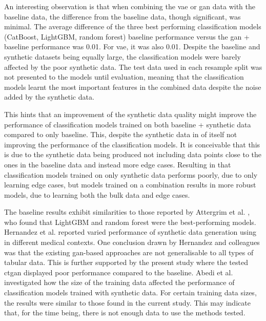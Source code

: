 \documentclass[12pt, a4paper]{article}
\begin{document}
An interesting observation is that when combining the \acrshort{vae} or \acrshort{gan} data with the baseline data, the difference from the baseline data, though significant, was minimal. The average difference of the three best performing classification models (CatBoost, LightGBM, random forest) baseline performance versus the \acrshort{gan} + baseline performance was 0.01. For \acrshort{vae}, it was also 0.01. Despite the baseline and synthetic datasets being equally large, the classification models were barely affected by the poor synthetic data. The test data used in each resample split was not presented to the models until evaluation, meaning that the classification models learnt the most important features in the combined data despite the noise added by the synthetic data.

This hints that an improvement of the synthetic data quality might improve the performance of classification models trained on both baseline + synthetic data compared to only baseline. This, despite the synthetic data in of itself not improving the performance of the classification models. It is conceivable that this is due to the synthetic data being produced not including data points close to the ones in the baseline data and instead more edge cases. Resulting in that classification models trained on only synthetic data performs poorly, due to only learning edge cases, but models trained on a combination results in more robust models, due to learning both the bulk data and edge cases.

The baseline results exhibit similarities to those reported by Attergrim et al. \cite{attergrim_predicting_2023}, who found that LightGBM and random forest were the best-performing models. Hernandez et al. \cite{hernandez_synthetic_2022} reported varied performance of synthetic data generation using  in different medical contexts. One conclusion drawn by Hernandez and colleagues was that the existing \acrlong{gan}-based approaches are not generalisable to all types of tabular data. This is further supported by the present study where the tested \acrshort{ctgan} displayed poor performance compared to the baseline. Abedi et al. \cite{abedi_gan-based_2022} investigated how the size of the training data affected the performance of classification models trained with synthetic data. For certain training data sizes, the results were similar to those found in the current study. This may indicate that, for the time being, there is not enough data to use the methods tested.
\end{document}
